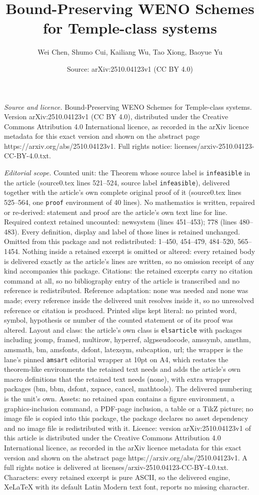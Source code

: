\documentclass[10pt,a4paper]{amsart}
\title[Bound-Preserving WENO Schemes for Temple-class systems]{Bound-Preserving WENO Schemes for Temple-class systems}
\author{Wei Chen, Shumo Cui, Kailiang Wu, Tao Xiong, Baoyue Yu}
\date{Source: arXiv:2510.04123v1 (CC BY 4.0)}
\begin{document}
\maketitle

\noindent\emph{Source and licence.} Bound-Preserving WENO Schemes for Temple-class systems. Version arXiv:2510.04123v1 (CC BY 4.0), distributed under the Creative Commons Attribution 4.0 International licence, as recorded in the arXiv licence metadata for this exact version and shown on the abstract page https://arxiv.org/abs/2510.04123v1. Full rights notice: licenses/arxiv-2510.04123-CC-BY-4.0.txt.\par\smallskip

\noindent\textit{Editorial scope.} Counted unit: the Theorem whose source label is \texttt{infeasible} in the article (source0.tex lines 521--524, source label \texttt{infeasible}), delivered together with the article's own complete original proof of it (source0.tex lines 525--564, one \texttt{proof} environment of 40 lines). No mathematics is written, repaired or re-derived: statement and proof are the article's own text line for line. Required context retained uncounted: newsystem (lines 451--453); 778 (lines 480--483). Every definition, display and label of those lines is retained unchanged. Omitted from this package and not redistributed: 1--450, 454--479, 484--520, 565--1454. Nothing inside a retained excerpt is omitted or altered: every retained body is delivered exactly as the article's lines are written, so no omission receipt of any kind accompanies this package. Citations: the retained excerpts carry no citation command at all, so no bibliography entry of the article is transcribed and no reference is redistributed. Reference adaptation: none was needed and none was made; every reference inside the delivered unit resolves inside it, so no unresolved reference or citation is produced. Printed slips kept literal: no printed word, symbol, hypothesis or number of the counted statement or of its proof was altered. Layout and class: the article's own class is \texttt{elsarticle} with packages including jcomp, framed, multirow, hyperref, algpseudocode, amssymb, amsthm, amsmath, bm, amsfonts, dsfont, latexsym, subcaption, url; the wrapper is the lane's pinned \texttt{amsart} editorial wrapper at 10pt on A4, which restates the theorem-like environments the retained text needs and adds the article's own macro definitions that the retained text needs (none), with extra wrapper packages (bm, bbm, dsfont, xspace, cancel, mathtools). The delivered numbering is the unit's own. Assets: no retained span contains a figure environment, a graphics-inclusion command, a PDF-page inclusion, a table or a TikZ picture; no image file is copied into this package, the package declares no asset dependency and no image file is redistributed with it. Licence: version arXiv:2510.04123v1 of this article is distributed under the Creative Commons Attribution 4.0 International licence, as recorded in the arXiv licence metadata for this exact version and shown on the abstract page https://arxiv.org/abs/2510.04123v1. A full rights notice is delivered at licenses/arxiv-2510.04123-CC-BY-4.0.txt. Characters: every retained excerpt is pure ASCII, so the delivered engine, XeLaTeX with its default Latin Modern text font, reports no missing character.
\end{document}

